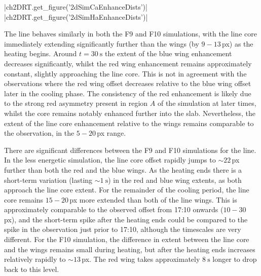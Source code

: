 \py[2DRT]|ch2DRT.get_figure('2dSimCaEnhanceDists')|
\py[2DRT]|ch2DRT.get_figure('2dSimHaEnhanceDists')|

The \CaLine{} line behaves similarly in both the F9 and F10 simulations, with the line core immediately extending significantly further than the wings (by $9-13$\,{}px) as the heating begins.
Around $t=\SI{30}{\second}$ the extent of the blue wing enhancement decreases significantly, whilst the red wing enhancement remains approximately constant, slightly approaching the line core.
This is not in agreement with the observations where the red wing offset decreases relative to the blue wing offset later in the cooling phase.
The consistency of the red enhancement is likely due to the strong red asymmetry present in region $A$ of the simulation at later times, whilst the core remains notably enhanced further into the slab.
Nevertheless, the extent of the line core enhancement relative to the wings remains comparable to the observation, in the $5-20$\,{}px range.

There are significant differences between the F9 and F10 simulations for the \Ha{} line.
In the less energetic simulation, the line core offset rapidly jumps to $\sim22$\,{}px further than both the red and the blue wings.
As the heating ends there is a short-term variation (lasting $\sim\SI{1}{\second}$) in the red and blue wing extents, as both approach the line core extent.
For the remainder of the cooling period, the line core remains $15-20$\,{}px more extended than both of the line wings.
This is approximately comparable to the observed offset from 17:10 onwards ($10-30$\,{}px), and the short-term spike after the heating ends could be compared to the spike in the observation just prior to 17:10, although the timescales are very different.
For the F10 simulation, the difference in extent between the line core and the wings remains small during heating, but after the heating ends increases relatively rapidly to $\sim13$\,{}px.
The red wing takes approximately $\SI{8}{\second}$ longer to drop back to this level.

